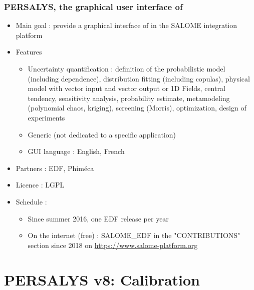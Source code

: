 \documentclass{beamer}
\begin{document}

\begin{frame}
\frametitle{PERSALYS, the graphical user interface of \ot{}}
	
\begin{itemize}
\item Main goal : provide a graphical interface of 
\ot{} in the SALOME integration platform
\item Features
	\begin{itemize}
	\item Uncertainty quantification : definition of the 
	probabilistic model (including dependence), distribution fitting (including 
	copulas), physical model with vector input 
	and vector output or 1D Fields,
	central tendency, sensitivity analysis, probability estimate, 
	metamodeling (polynomial chaos, kriging), screening (Morris), 
	optimization, design of experiments
	\item Generic (not dedicated to a specific application)
	\item GUI language : English, French
	\end{itemize}

\item Partners : EDF, Phiméca
\item Licence : LGPL

\item Schedule : 
	\begin{itemize}
	\item Since summer 2016, one EDF release per year
	\item On the internet (free) : SALOME\_EDF in the "CONTRIBUTIONS" section 
	since 2018 on \url{https://www.salome-platform.org}
	
	\end{itemize}

\end{itemize}

\end{frame}





\section{PERSALYS v8: Calibration}
\end{document}
